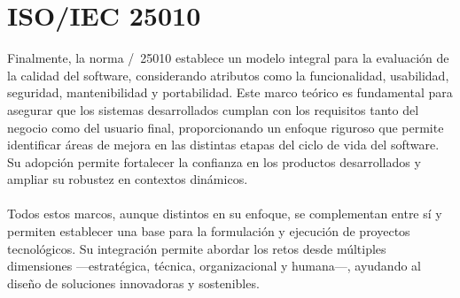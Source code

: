 \section{ISO/IEC 25010}
\noindent
Finalmente, la norma \ISO/\IEC\ 25010 establece un modelo integral para la evaluación de la calidad del software, considerando atributos como la funcionalidad, usabilidad, seguridad, mantenibilidad y portabilidad\citep{ISO25010}. Este marco teórico es fundamental para asegurar que los sistemas desarrollados cumplan con los requisitos tanto del negocio como del usuario final, proporcionando un enfoque riguroso que permite identificar áreas de mejora en las distintas etapas del ciclo de vida del software. Su adopción permite fortalecer la confianza en los productos desarrollados y ampliar su robustez en contextos dinámicos.\\ \\
\noindent
Todos estos marcos, aunque distintos en su enfoque, se complementan entre sí y permiten establecer una base para la formulación y ejecución de proyectos tecnológicos. Su integración permite abordar los retos desde múltiples dimensiones —estratégica, técnica, organizacional y humana—, ayudando al diseño de soluciones innovadoras y sostenibles.